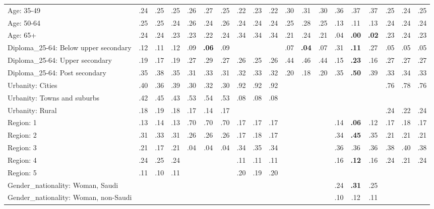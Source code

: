 \begin{tabular}[t]{lcccccccccccccccccc}
Age: 35-49 & .24 & .25 & .25 & .26 & .27 & .25 & .22 & .23 & .22 & .30 & .31 & .30 & .36 & .37 & .37 & .25 & .24 & .25\\
Age: 50-64 & .25 & .25 & .24 & .26 & .24 & .26 & .24 & .24 & .24 & .25 & .28 & .25 & .13 & .11 & .13 & .24 & .24 & .24\\
Age: 65+ & .24 & .24 & .23 & .23 & .22 & .24 & .34 & .34 & .34 & .21 & .24 & .21 & .04 & \textbf{.00} & \textbf{.02} & .23 & .24 & .23\\
\addlinespace
Diploma\_25-64: Below upper secondary & .12 & .11 & .12 & .09 & \textbf{.06} & .09 &  &  &  & .07 & \textbf{.04} & .07 & .31 & \textbf{.11} & .27 & .05 & .05 & .05\\
Diploma\_25-64: Upper secondary & .19 & .17 & .19 & .27 & .29 & .27 & .26 & .25 & .26 & .44 & .46 & .44 & .15 & \textbf{.23} & .16 & .27 & .27 & .27\\
Diploma\_25-64: Post secondary & .35 & .38 & .35 & .31 & .33 & .31 & .32 & .33 & .32 & .20 & .18 & .20 & .35 & \textbf{.50} & .39 & .33 & .34 & .33\\
\addlinespace
Urbanity: Cities & .40 & .36 & .39 & .30 & .32 & .30 & .92 & .92 & .92 &  &  &  &  &  &  & .76 & .78 & .76\\
Urbanity: Towns and suburbs & .42 & .45 & .43 & .53 & .54 & .53 & .08 & .08 & .08 &  &  &  &  &  &  &  &  & \\
Urbanity: Rural & .18 & .19 & .18 & .17 & .14 & .17 &  &  &  &  &  &  &  &  &  & .24 & .22 & .24\\
\addlinespace
Region: 1 & .13 & .14 & .13 & .70 & .70 & .70 & .17 & .17 & .17 &  &  &  & .14 & \textbf{.06} & .12 & .17 & .18 & .17\\
Region: 2 & .31 & .33 & .31 & .26 & .26 & .26 & .17 & .18 & .17 &  &  &  & .34 & \textbf{.45} & .35 & .21 & .21 & .21\\
Region: 3 & .21 & .17 & .21 & .04 & .04 & .04 & .34 & .35 & .34 &  &  &  & .36 & .36 & .36 & .38 & .40 & .38\\
Region: 4 & .24 & .25 & .24 &  &  &  & .11 & .11 & .11 &  &  &  & .16 & \textbf{.12} & .16 & .24 & .21 & .24\\
Region: 5 & .11 & .10 & .11 &  &  &  & .20 & .19 & .20 &  &  &  &  &  &  &  &  & \\
\addlinespace
Gender\_nationality: Woman, Saudi &  &  &  &  &  &  &  &  &  &  &  &  & .24 & \textbf{.31} & .25 &  &  & \\
Gender\_nationality: Woman, non-Saudi &  &  &  &  &  &  &  &  &  &  &  &  & .10 & .12 & .11 &  &  & \\

\end{tabular}
